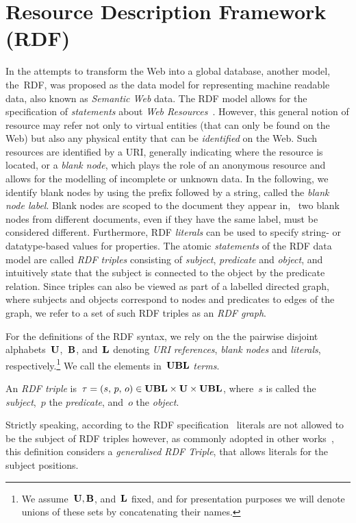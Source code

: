 

\section{Resource Description Framework (RDF)}
\label{sec:rdf}

In the attempts to transform the Web into a global database, another model, the~\acl{RDF}, was proposed as the data model
for representing machine readable data, also known as \emph{Semantic Web} data.  The \ac{RDF} model allows for the
specification of \emph{statements} about \emph{Web Resources}~\cite{ManolaMiller:2004aa}.
%
However, this general notion of resource may refer not only to virtual entities (that can only be found on the Web) but
also any physical entity that can be \emph{identified} on the Web.
%
Such resources are identified by a \ac{URI}, generally indicating where the resource is located, or a \emph{blank node},
which plays the role of an anonymous resource and allows for the modelling of incomplete or unknown data.  In the
following, we identify blank nodes by using the prefix \character{\_:} followed by a string, called the \emph{blank node
  label}.  Blank nodes are scoped to the document they appear in, \ie~two blank nodes from different documents, even if
they have the same label, must be considered different.
%
Furthermore, \ac{RDF} \emph{literals} can be used to specify string- or datatype-based values for properties.
%
The atomic \emph{statements} of the \ac{RDF} data model are called \emph{RDF triples} consisting of \emph{subject},
\emph{predicate} and \emph{object}, and intuitively state that
%
the subject is connected to the object by the predicate relation.
%
Since triples can also be viewed as part of a labelled directed graph, where subjects and objects correspond to nodes
and predicates to edges of the graph, we refer to a set of such \ac{RDF} triples as an \emph{RDF graph}.
%


For the definitions of the \ac{RDF} syntax, we rely on the the pairwise disjoint alphabets~$\mathbf{U}$,~$\mathbf{B}$, and~$\mathbf{L}$
denoting \emph{URI references}, \emph{blank nodes} and \emph{literals}, respectively.\footnote{We assume~$\mathbf{U}, \mathbf{B}$,
  and~$\mathbf{L}$ fixed, and for presentation purposes we will denote unions of these sets by concatenating their names.}  We
call the elements in~$\mathbf{UBL}$ \emph{terms}.
%
\begin{definition}
  \label{def:rdf-triple}
  An \emph{RDF triple} is~$\tau = (s,\ \!p,\ \!o) \in \mathbf{UBL} \times \mathbf{U} \times \mathbf{UBL}$, where~$s$ is called the
  \emph{subject},~$p$ the \emph{predicate}, and~$o$ the \emph{object}.
\end{definition}
%
\nd Strictly speaking, according to the \ac{RDF} specification~\cite{Hayes:2004aa} literals are not allowed to be the
subject of \ac{RDF} triples however, as commonly adopted in other
works~\cite{MunozPerezGutierrez:2007aa,PrudhommeauxSeaborne:2008aa,CarrollBizerHayes:2005aa}, this definition considers
a \emph{generalised RDF Triple}, that allows literals for the subject positions.


